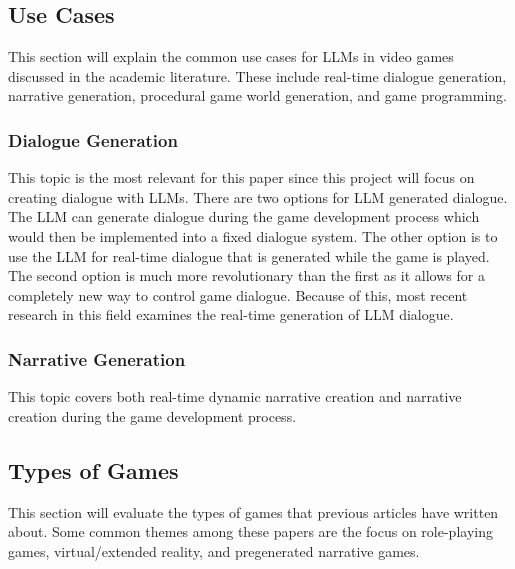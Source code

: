 \documentclass[10pt,twocolumn]{article}
\begin{document}
    \subsection{Use Cases}

        \par
        This section will explain the common use cases for LLMs in video games discussed in the academic literature. These include real-time dialogue generation, narrative generation, procedural game world generation, and game programming.
    
        \subsubsection{Dialogue Generation}
        
            \par
            This topic is the most relevant for this paper since this project will focus on creating dialogue with LLMs. There are two options for LLM generated dialogue. The LLM can generate dialogue during the game development process which would then be implemented into a fixed dialogue system. The other option is to use the LLM for real-time dialogue that is generated while the game is played. The second option is much more revolutionary than the first as it allows for a completely new way to control game dialogue. Because of this, most recent research in this field examines the real-time generation of LLM dialogue.
    
        \subsubsection{Narrative Generation}
            
            \par
            This topic covers both real-time dynamic narrative creation and narrative creation during the game development process.
            

    \subsection{Types of Games}

        \par
        This section will evaluate the types of games that previous articles have written about. Some common themes among these papers are the focus on role-playing games, virtual/extended reality, and pregenerated narrative games.
\end{document}

